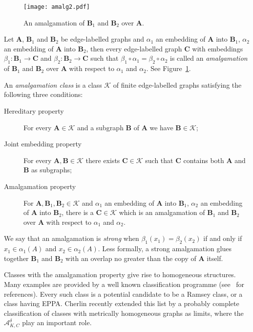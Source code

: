 \documentclass[11pt]{amsart}
\def\str#1{\mathbf {#1}}
\def\K{{\mathcal K}}
\def\role{role}
\begin{document}
\begin{figure}
\centering
  \texttt{[image: amalg2.pdf]}
\caption{An amalgamation of $\str{B}_1$ and $\str{B}_2$ over $\str{A}$.}
\label{amalgamfig}
\end{figure}%
Let $\str{A}$, $\str{B}_1$ and $\str{B}_2$ be edge-labelled graphs and $\alpha_1$ an embedding of $\str{A}$
into $\str{B}_1$, $\alpha_2$ an embedding of $\str{A}$ into $\str{B}_2$, then
every edge-labelled graph $\str{C}$
 with embeddings $\beta_1\colon\str{B}_1 \to \str{C}$ and
$\beta_2\colon\str{B}_2\to\str{C}$ such that $\beta_1\circ\alpha_1 =
\beta_2\circ\alpha_2$ is called an \emph{amalgamation} of $\str{B}_1$ and $\str{B}_2$ over $\str{A}$ with respect to $\alpha_1$ and $\alpha_2$. See Figure~\ref{amalgamfig}.

An \emph{amalgamation class} is a class $\K$ of finite edge-labelled graphs satisfying the following three conditions:
\begin{description}
\item[Hereditary property] For every $\str{A}\in \K$ and a subgraph $\str{B}$ of $\str{A}$ we have $\str{B}\in \K$;
\item[Joint embedding property] For every $\str{A}, \str{B}\in \K$ there exists $\str{C}\in \K$ such that $\str{C}$ contains both $\str{A}$ and $\str{B}$ as subgraphs;
\item[Amalgamation property]
For $\str{A},\str{B}_1,\str{B}_2\in \K$ and $\alpha_1$ an embedding of $\str{A}$ into $\str{B}_1$, $\alpha_2$ an embedding of $\str{A}$ into $\str{B}_2$, there is a $\str{C}\in \K$ which is an amalgamation of $\str{B}_1$ and $\str{B}_2$ over $\str{A}$ with respect to $\alpha_1$ and $\alpha_2$.
\end{description}

We say that an amalgamation is \emph{strong} when $\beta_1(x_1)=\beta_2(x_2)$ if and
only if $x_1\in \alpha_1(A)$ and $x_2\in \alpha_2(A)$.  Less formally, a strong
amalgamation glues together $\str{B}_1$ and $\str{B}_2$ with an overlap no
greater than the copy of $\str{A}$ itself. 

Classes with the amalgamation property give rise to homogeneous structures. Many
examples are provided by a well known classification programme
(see~\cite{Cherlin2013} for references). Every such class is a potential
candidate to be a Ramsey class, or a class having EPPA.  Cherlin recently extended
this list by a probably complete classification of classes with metrically homogeneous graphs as limits, where the 
$\mathcal A^\delta_{K,C}$ play an important \role{}.
\end{document}
